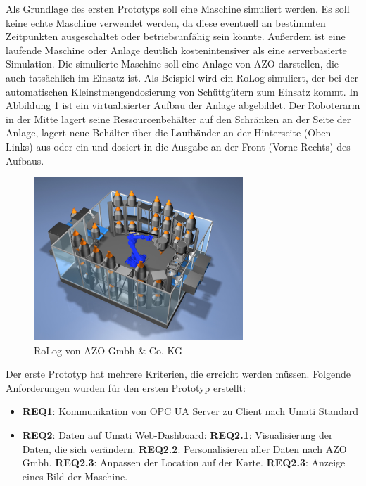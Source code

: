 \documentclass[a4paper, 12pt, oneside, toc=listofnumbered, bibliography=totoc]{scrbook}
\begin{document}
		Als Grundlage des ersten Prototyps soll eine Maschine simuliert werden. Es soll keine echte Maschine verwendet werden, da diese eventuell an bestimmten Zeitpunkten ausgeschaltet oder betriebsunfähig sein könnte. Außerdem ist eine laufende Maschine oder Anlage deutlich kostenintensiver als eine serverbasierte Simulation. Die simulierte Maschine soll eine Anlage von AZO darstellen, die auch tatsächlich im Einsatz ist. Als Beispiel wird ein RoLog simuliert, der bei der automatischen Kleinstmengendosierung von Schüttgütern zum Einsatz kommt. In Abbildung \ref{fig:RoLog} ist ein virtualisierter Aufbau der Anlage abgebildet. Der Roboterarm in der Mitte lagert seine Ressourcenbehälter auf den Schränken an der Seite der Anlage, lagert neue Behälter über die Laufbänder an der Hinterseite (Oben-Links) aus oder ein und dosiert in die Ausgabe an der Front (Vorne-Rechts) des Aufbaus. \cite{noauthor_azo_nodate}
		
		\begin{figure}[H]
			\centering
			\includegraphics[width=0.7\textwidth]{res/RoLog.png}
			\caption{RoLog von AZO Gmbh \& Co. KG \cite{noauthor_azo_nodate}}
			\label{fig:RoLog}
		\end{figure}
	
		Der erste Prototyp hat mehrere Kriterien, die erreicht werden müssen. Folgende Anforderungen wurden für den ersten Prototyp erstellt:
		
		\begin{itemize}
			\item \textbf{REQ1}: Kommunikation von OPC UA Server zu Client nach Umati Standard
			\item \textbf{REQ2}: Daten auf Umati Web-Dashboard:
			\subitem \textbf{REQ2.1}: Visualisierung der Daten, die sich verändern.
			\subitem \textbf{REQ2.2}: Personalisieren aller Daten nach AZO Gmbh.
			\subitem \textbf{REQ2.3}: Anpassen der Location auf der Karte.
			\subitem \textbf{REQ2.3}: Anzeige eines Bild der Maschine.
		\end{itemize}
		
\end{document}
